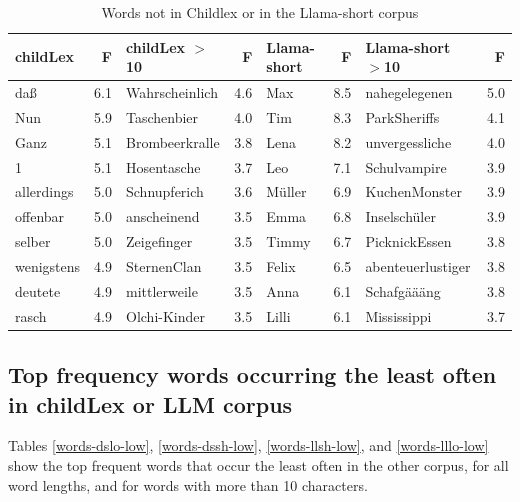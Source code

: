 \documentclass[manuscript]{stjour}
\begin{document}
\begin{table}[!htbp]
\caption{Words not in Childlex or in the Llama-short corpus}
\centering
\begin{tabular}{lrlrlrlr}
  \hline
childLex & F & childLex $>$10 & F & Llama-short & F & Llama-short $>$10 & F \\ 
  \hline
daß & 6.1 & Wahrscheinlich & 4.6 & Max & 8.5 & nahegelegenen & 5.0 \\ 
  Nun & 5.9 & Taschenbier & 4.0 & Tim & 8.3 & ParkSheriffs & 4.1 \\ 
  Ganz & 5.1 & Brombeerkralle & 3.8 & Lena & 8.2 & unvergessliche & 4.0 \\ 
  1 & 5.1 & Hosentasche & 3.7 & Leo & 7.1 & Schulvampire & 3.9 \\ 
  allerdings & 5.0 & Schnupferich & 3.6 & Müller & 6.9 & KuchenMonster & 3.9 \\ 
  offenbar & 5.0 & anscheinend & 3.5 & Emma & 6.8 & Inselschüler & 3.9 \\ 
  selber & 5.0 & Zeigefinger & 3.5 & Timmy & 6.7 & PicknickEssen & 3.8 \\ 
  wenigstens & 4.9 & SternenClan & 3.5 & Felix & 6.5 & abenteuerlustiger & 3.8 \\ 
  deutete & 4.9 & mittlerweile & 3.5 & Anna & 6.1 & Schafgäääng & 3.8 \\ 
  rasch & 4.9 & Olchi-Kinder & 3.5 & Lilli & 6.1 & Mississippi & 3.7 \\ 
   \hline
\end{tabular}
\label{words-llsh}
\end{table}

\clearpage




\subsection{Top frequency words occurring the least often in childLex or LLM corpus}

Tables \ref{words-dslo-low}, \ref{words-dssh-low}, \ref{words-llsh-low}, and \ref{words-lllo-low} show the top frequent words that occur the least often in the other corpus, for all word lengths, and for words with more than 10 characters.
\end{document}
